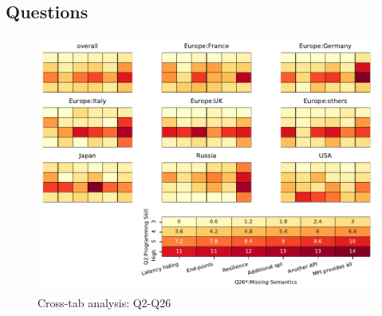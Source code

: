 
\subsection{Questions}


\begin{figure}
\begin{center}
\includegraphics[width=12cm]{../pdfs/Q2-Q26.pdf}
\caption{Cross-tab analysis: Q2-Q26}
\label{fig:Q2-Q26}
\end{center}
\end{figure}
